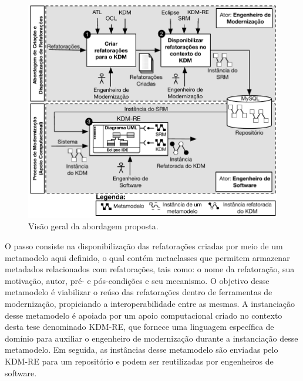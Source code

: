 \begin{figure}[h]
	\centering
	\caption{Visão geral da abordagem proposta.}
	\label{fig:abordagem_kdm_tese_processo}
	\includegraphics[scale=0.8]{images/NovaFiguraSintexeAbordagem}
	\fautor
\end{figure}

O passo  consiste na disponibilização das refatorações criadas por meio de um metamodelo aqui definido, o qual contém metaclasses que permitem armazenar metadados relacionados com refatorações, tais como: o nome da refatoração, sua motivação, autor, pré- e pós-condições e seu mecanismo. O objetivo desse metamodelo é viabilizar o reúso das refatorações dentro de ferramentas de modernização, propiciando a interoperabilidade entre as mesmas. A instanciação desse metamodelo é apoiada por um apoio computacional criado no contexto desta tese denominado KDM-RE, que fornece uma linguagem específica de domínio para auxiliar o engenheiro de modernização durante a instanciação desse metamodelo. Em seguida, as instâncias desse metamodelo são enviadas pelo KDM-RE para um repositório e podem ser reutilizadas por engenheiros de software. 


